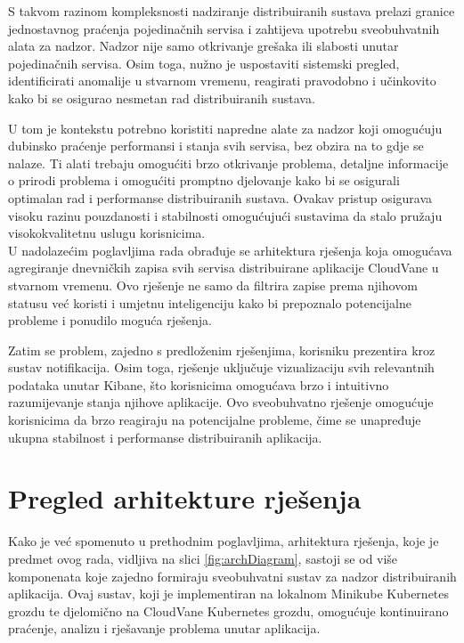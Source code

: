 \documentclass[times, utf8, diplomski]{fer}
\begin{document}
S takvom razinom kompleksnosti nadziranje distribuiranih sustava prelazi granice jednostavnog praćenja pojedinačnih servisa i zahtijeva upotrebu sveobuhvatnih alata za nadzor. Nadzor nije samo otkrivanje grešaka ili slabosti unutar pojedinačnih servisa. Osim toga, nužno je uspostaviti sistemski pregled, identificirati anomalije u stvarnom vremenu, reagirati pravodobno i učinkovito kako bi se osigurao nesmetan rad distribuiranih sustava.

U tom je kontekstu potrebno koristiti napredne alate za nadzor koji omogućuju dubinsko praćenje performansi i stanja svih servisa, bez obzira na to gdje se nalaze. Ti alati trebaju omogućiti brzo otkrivanje problema, detaljne informacije o prirodi problema i omogućiti promptno djelovanje kako bi se osigurali optimalan rad i performanse distribuiranih sustava. Ovakav pristup osigurava visoku razinu pouzdanosti i stabilnosti omogućujući sustavima da stalo pružaju visokokvalitetnu uslugu korisnicima.\\

U nadolazećim poglavljima rada obrađuje se arhitektura rješenja koja omogućava agregiranje dnevničkih zapisa svih servisa distribuirane aplikacije CloudVane u stvarnom vremenu. Ovo rješenje ne samo da filtrira zapise prema njihovom statusu već koristi i umjetnu inteligenciju kako bi prepoznalo potencijalne probleme i ponudilo moguća rješenja.

Zatim se problem, zajedno s predloženim rješenjima, korisniku prezentira kroz sustav notifikacija. Osim toga, rješenje uključuje vizualizaciju svih relevantnih podataka unutar Kibane, što korisnicima omogućava brzo i intuitivno razumijevanje stanja njihove aplikacije. Ovo sveobuhvatno rješenje omogućuje korisnicima da brzo reagiraju na potencijalne probleme, čime se unapređuje ukupna stabilnost i performanse distribuiranih aplikacija.

\section{Pregled arhitekture rješenja}

Kako je već spomenuto u prethodnim poglavljima, arhitektura rješenja, koje je predmet ovog rada, vidljiva na slici \ref{fig:archDiagram}, sastoji se od više komponenata koje zajedno formiraju sveobuhvatni sustav za nadzor distribuiranih aplikacija. Ovaj sustav, koji je implementiran na lokalnom Minikube Kubernetes grozdu te djelomično na CloudVane Kubernetes grozdu, omogućuje kontinuirano praćenje, analizu i rješavanje problema unutar aplikacija.\\
\end{document}
